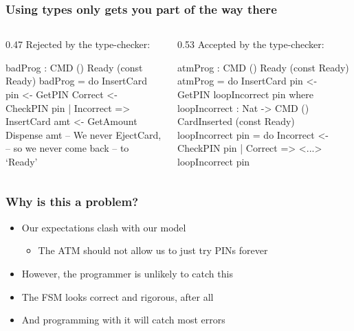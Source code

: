 \documentclass[compress,handout]{beamer}
\begin{document}
\begin{frame}[fragile]  %
  \frametitle{Using types only gets you part of the way there}

  \begin{columns}
  \begin{column}{0.47\framewidth}
    {\color{red} Rejected by the type-checker:}
    \vspace*{-3mm}
    \begin{idrislisting}[basicstyle=\ttfamily\scriptsize]
badProg : CMD ()
            Ready (const Ready)
badProg = do
  InsertCard
  pin <- GetPIN
  Correct <- CheckPIN pin
    | Incorrect => InsertCard
  amt <- GetAmount
  Dispense amt 
  -- We never EjectCard,
  -- so we never come back
  -- to `Ready'
    \end{idrislisting}
  \end{column}

  \pause  %

  \hspace*{-0.6mm}
  \vrule{}

  \begin{column}{0.53\framewidth}
    {\color{orange} Accepted by the type-checker:}
    \vspace*{-3mm}
    \begin{idrislisting}[basicstyle=\ttfamily\scriptsize]
atmProg : CMD ()
            Ready (const Ready)
atmProg = do
    InsertCard
    pin <- GetPIN
    loopIncorrect pin
  where
    loopIncorrect : Nat -> CMD ()
                      CardInserted
                      (const Ready)
    loopIncorrect pin = do
      Incorrect <- CheckPIN pin
        | Correct => <...>
      loopIncorrect pin
    \end{idrislisting}
    \vspace*{-6mm}
  \end{column}
  \end{columns}
\end{frame}


\begin{frame}
  \frametitle{Why is this a problem?}

  \begin{itemize}
    \item<1-> Our expectations clash with our model
    \begin{itemize}
      \item<2-> The ATM should not allow us to just try PINs forever
    \end{itemize}
    \item<3-> However, the programmer is unlikely to catch this
    \item<4-> The FSM looks correct and rigorous, after all
    \item<5-> And programming with it will catch most errors
  \end{itemize}
\end{frame}
\end{document}
